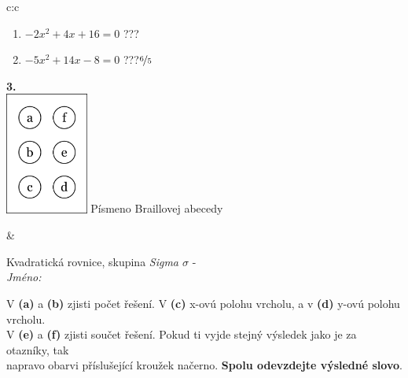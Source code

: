 \documentclass[10pt]{report}
\begin{document}
\begin{tabular}{c:c}
\begin{minipage}[c][104.5mm][t]{0.5\linewidth}
\begin{center}
\begin{minipage}{0.79\linewidth}
\begin{center}
\begin{varwidth}{\linewidth}
\begin{enumerate}
\item $-2x^2+4x+16=0$\quad \dotfill\; ???\;\dotfill {}
\item $-5x^2+14x-8=0$\quad \dotfill\; ???\;\dotfill \quad $\nicefrac{6}{5}$
\end{enumerate}
\end{varwidth}
\end{center}
\end{minipage}
\begin{minipage}{0.20\linewidth}
\begin{center}
{\Huge\bfseries 3.} \\[2mm]
\includegraphics[height=40mm]{../images/braille.png}
{\small Písmeno Braillovej abecedy}
\end{center}
\end{minipage}
\end{center}
\end{minipage}
&
\begin{minipage}[c][104.5mm][t]{0.5\linewidth}
\begin{center}
\vspace{7mm}
{\huge Kvadratická rovnice, skupina \textit{Sigma $\sigma$} -}\\[5mm]
\textit{Jméno:}\phantom{xxxxxxxxxxxxxxxxxxxxxxxxxxxxxxxxxxxxxxxxxxxxxxxxxxxxxxxxxxxxxxxxx}\\[5mm]
\begin{minipage}{0.95\linewidth}
\begin{center}
V \textbf{(a)} a \textbf{(b)} zjisti počet řešení. V \textbf{(c)} x-ovú polohu vrcholu, a v \textbf{(d)} y-ovú polohu vrcholu.\\V \textbf{(e)} a \textbf{(f)} zjisti součet řešení. Pokud ti vyjde stejný výsledek jako je za otazníky, tak\\napravo obarvi příslušející kroužek načerno. \textbf{Spolu odevzdejte výsledné slovo}.
\end{center}
\end{minipage}
\\[1mm]
\begin{minipage}{0.79\linewidth}
\begin{center}

\end{center}
\end{minipage}
\end{center}
\end{minipage}
\end{tabular}
\end{document}
